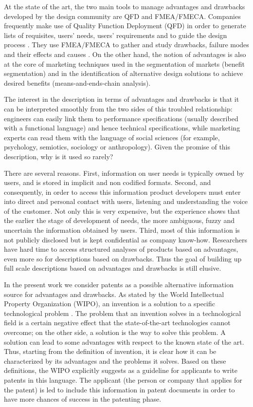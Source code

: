\documentclass[]{book}
\begin{document}
At the state of the art, the two main tools to manage advantages and
drawbacks developed by the design community are QFD and FMEA/FMECA.
Companies frequently make use of Quality Function Deployment (QFD) in
order to generate lists of requisites, users' needs, users' requirements
and to guide the design process \citep{carnevalli2008review}. They use
FMEA/FMECA to gather and study drawbacks, failure modes and their
effects and causes \citep{liu2013risk}. On the other hand, the notion of
advantages is also at the core of marketing techniques used in the
segmentation of markets (benefit segmentation) and in the identification
of alternative design solutions to achieve desired benefits
(means-and-ends-chain analysis).

The interest in the description in terms of advantages and drawbacks is
that it can be interpreted smoothly from the two sides of this troubled
relationship: engineers can easily link them to performance
specifications (usually described with a functional language) and hence
technical specifications, while marketing experts can read them with the
language of social sciences (for example, psychology, semiotics,
sociology or anthropology). Given the promise of this description, why
is it used so rarely?

There are several reasons. First, information on user needs is typically
owned by users, and is stored in implicit and non codified formats.
Second, and consequently, in order to access this information product
developers must enter into direct and personal contact with users,
listening and understanding the voice of the customer. Not only this is
very expensive, but the experience shows that the earlier the stage of
development of needs, the more ambiguous, fuzzy and uncertain the
information obtained by users. Third, most of this information is not
publicly disclosed but is kept confidential as company know-how.
Researchers have hard time to access structured analyses of products
based on advantages, even more so for descriptions based on drawbacks.
Thus the goal of building up full scale descriptions based on advantages
and drawbacks is still elusive.

In the present work we consider patents as a possible alternative
information source for advantages and drawbacks. As stated by the World
Intellectual Property Organization (WIPO), an invention is a solution to
a specific technological problem \citep{world2004wipo}. The problem that
an invention solves in a technological field is a certain negative
effect that the state-of-the-art technologies cannot overcome; on the
other side, a solution is the way to solve this problem. A solution can
lead to some advantages with respect to the known state of the art.
Thus, starting from the definition of invention, it is clear how it can
be characterized by its advantages and the problems it solves. Based on
these definitions, the WIPO explicitly suggests as a guideline for
applicants to write patents in this language. The applicant (the person
or company that applies for the patent) is led to include this
information in patent documents in order to have more chances of success
in the patenting phase.
\end{document}
